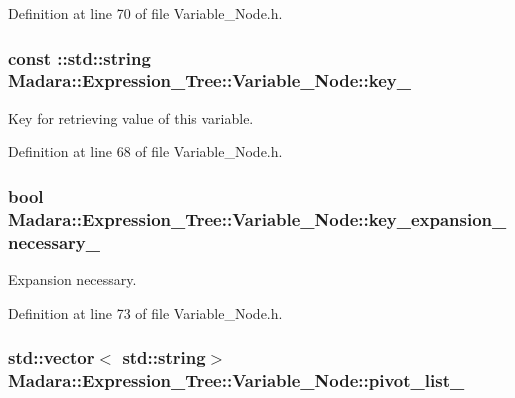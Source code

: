 Definition at line 70 of file Variable\_\-Node.h.

\hypertarget{classMadara_1_1Expression__Tree_1_1Variable__Node_a4777ea77f74c58e68314afb95d255ee8}{
\subsubsection[{key\_\-}]{\setlength{\rightskip}{0pt plus 5cm}const ::std::string {\bf Madara::Expression\_\-Tree::Variable\_\-Node::key\_\-}}}
\label{df/d66/classMadara_1_1Expression__Tree_1_1Variable__Node_a4777ea77f74c58e68314afb95d255ee8}


Key for retrieving value of this variable. 



Definition at line 68 of file Variable\_\-Node.h.

\hypertarget{classMadara_1_1Expression__Tree_1_1Variable__Node_a6995a5a6417f6103ec5aaa465c7af6cd}{
\subsubsection[{key\_\-expansion\_\-necessary\_\-}]{\setlength{\rightskip}{0pt plus 5cm}bool {\bf Madara::Expression\_\-Tree::Variable\_\-Node::key\_\-expansion\_\-necessary\_\-}}}
\label{df/d66/classMadara_1_1Expression__Tree_1_1Variable__Node_a6995a5a6417f6103ec5aaa465c7af6cd}


Expansion necessary. 



Definition at line 73 of file Variable\_\-Node.h.

\hypertarget{classMadara_1_1Expression__Tree_1_1Variable__Node_ad0ff5eb1d8d6302592c7d1e0a648d8ec}{
\subsubsection[{pivot\_\-list\_\-}]{\setlength{\rightskip}{0pt plus 5cm}std::vector$<$ std::string$>$ {\bf Madara::Expression\_\-Tree::Variable\_\-Node::pivot\_\-list\_\-}}}
\label{df/d66/classMadara_1_1Expression__Tree_1_1Variable__Node_ad0ff5eb1d8d6302592c7d1e0a648d8ec}


